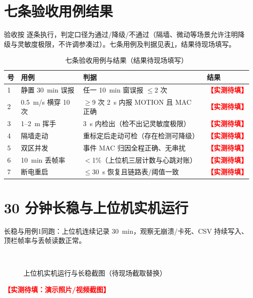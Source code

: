 \section{七条验收用例结果}\label{sec:accept}

验收按  逐条执行，判定口径为通过/降级/不通过（隔墙、微动等场景允许注明降级与灵敏度极限，不许调参凑过）。七条用例及判据见表\ref{tab:accept}，结果待现场填写。

\begin{table}[htbp]
  \centering
  \caption{七条验收用例与结果（结果待现场填写）}
  \label{tab:accept}
  \begin{tabular}{p{0.5cm}p{6.0cm}p{4.6cm}p{2.6cm}}
    \toprule
    \textbf{号} & \textbf{用例} & \textbf{判据} & \textbf{结果} \\
    \midrule
    1 & 静置 30~min 误报 & 任一 10~min 窗误报 $\le$2 次 & \textcolor{red}{\textbf{【实测待填】}} \\
    2 & 0.5~m/s 横穿 10 次 & $\ge$9 次 2~s 内报 MOTION 且 MAC 正确 & \textcolor{red}{\textbf{【实测待填】}} \\
    3 & 1--2~m 挥手 & 3~s 内检出（检不出记灵敏度极限） & \textcolor{red}{\textbf{【实测待填】}} \\
    4 & 隔墙走动 & 重标定后走动可检（存在检测可降级） & \textcolor{red}{\textbf{【实测待填】}} \\
    5 & 双区并发 & 事件 MAC 归因全程正确、无串扰 & \textcolor{red}{\textbf{【实测待填】}} \\
    6 & 10~min 丢帧率 & $<$1\%（上位机三层计数与心跳对账） & \textcolor{red}{\textbf{【实测待填】}} \\
    7 & 断电重启 & $\le$30~s 恢复且链路表/阈值一致 & \textcolor{red}{\textbf{【实测待填】}} \\
    \bottomrule
  \end{tabular}
\end{table}

\section{30 分钟长稳与上位机实机运行}

长稳与用例1同跑：上位机连续记录 30~min，观察无崩溃/卡死、CSV 持续写入、顶栏帧率与丢帧读数正常。

\begin{figure}[htbp]
  \centering
  \\[6pt]
  \caption{上位机实机运行与长稳截图（待现场截取替换）}
  \label{fig:photo-ui}
\end{figure}

\textcolor{red}{\textbf{【实测待填：演示照片/视频截图】}}

